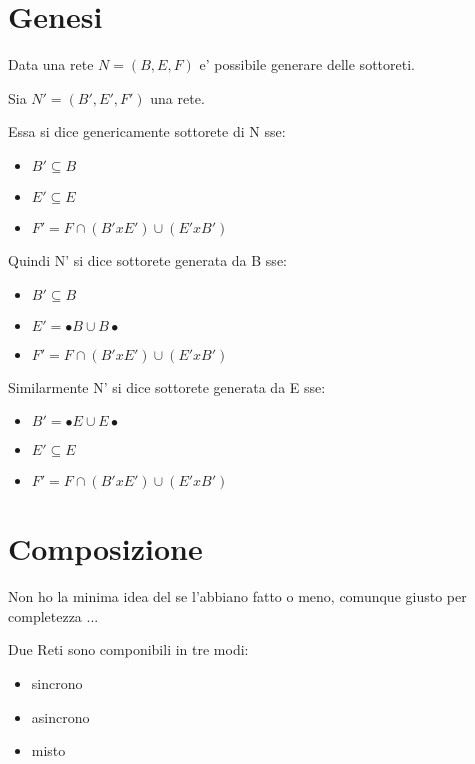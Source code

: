 \section{Genesi}

Data una rete $N = (B, E, F)$ e' possibile generare delle sottoreti.

Sia $N' = (B', E', F')$ una rete.

Essa si dice genericamente sottorete di N sse:
\begin{itemize}
  \item $B' \subseteq B$
  \item $E' \subseteq E$
  \item $F' = F \cap (B' x E') \cup (E' x B')$
\end{itemize}

Quindi N' si dice sottorete generata da B sse:
\begin{itemize}
  \item $B' \subseteq B$
  \item $E' = \bullet B \cup B \bullet$
  \item $F' = F \cap (B' x E') \cup (E' x B')$
\end{itemize}

Similarmente N' si dice sottorete generata da E sse:
\begin{itemize}
  \item $B' = \bullet E \cup E \bullet$
  \item $E' \subseteq E$
  \item $F' = F \cap (B' x E') \cup (E' x B')$
\end{itemize}

\section{Composizione}

Non ho la minima idea del se l'abbiano fatto o meno, comunque giusto per completezza ...

Due Reti sono componibili in tre modi:
\begin{itemize}
  \item sincrono
  \item asincrono
  \item misto
\end{itemize}

